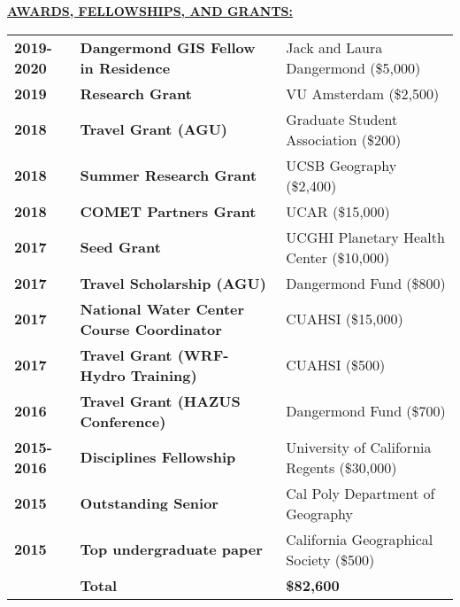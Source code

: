 \documentclass{article}
\newcommand{\header}[1]{\hspace{-5mm}\textcolor{header_blue}{\underline{\textbf{#1}}\\}} %
\begin{document}
\header{AWARDS, FELLOWSHIPS, AND GRANTS:}
\newline
\vspace{5mm}
\begin{tabular}{p{2.5cm}p{8.0cm}P{5cm}}
  \textbf{2019-2020 } & \textbf{Dangermond GIS Fellow in Residence } & Jack and Laura Dangermond (\$5,000) \\ 
  \textbf{2019 } & \textbf{Research Grant } & VU Amsterdam (\$2,500) \\ 
  \textbf{2018 } & \textbf{Travel Grant (AGU) } & Graduate Student Association (\$200) \\ 
  \textbf{2018 } & \textbf{Summer Research Grant } & UCSB Geography (\$2,400) \\ 
  \textbf{2018 } & \textbf{COMET Partners Grant } & UCAR (\$15,000) \\ 
  \textbf{2017 } & \textbf{Seed Grant } & UCGHI Planetary Health Center (\$10,000) \\ 
  \textbf{2017 } & \textbf{Travel Scholarship (AGU) } & Dangermond Fund (\$800) \\ 
  \textbf{2017 } & \textbf{National Water Center Course Coordinator } & CUAHSI (\$15,000) \\ 
  \textbf{2017 } & \textbf{Travel Grant (WRF-Hydro Training) } & CUAHSI (\$500) \\ 
  \textbf{2016 } & \textbf{Travel Grant (HAZUS Conference) } & Dangermond Fund (\$700) \\ 
  \textbf{2015-2016 } & \textbf{Disciplines Fellowship } & University of California Regents (\$30,000) \\ 
  \textbf{2015 } & \textbf{Outstanding Senior } & Cal Poly Department of Geography \\ 
  \textbf{2015 } & \textbf{Top undergraduate paper } & California Geographical Society (\$500) \\ 
  \textbf{ } & \textbf{Total } & \textbf{\$82,600 } \\ 
  \end{tabular}

\end{document}
